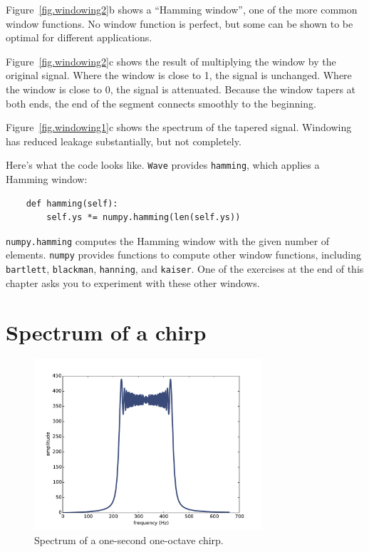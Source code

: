 \documentclass[12pt]{book}
\begin{document}
Figure~\ref{fig.windowing2}b shows a ``Hamming window'', one of the
more common window functions.  No window function is perfect, but some
can be shown to be optimal for different applications.

Figure~\ref{fig.windowing2}c shows the result of multiplying the
window by the original signal.  Where the window is close to 1, the
signal is unchanged.  Where the window is close to 0, the signal is
attenuated.  Because the window tapers at both ends, the end of the
segment connects smoothly to the beginning.

Figure~\ref{fig.windowing1}c shows the spectrum of the tapered signal.
Windowing has reduced leakage substantially, but not completely. 

Here's what the code looks like.  {\tt Wave} provides {\tt hamming},
which applies a Hamming window:

\begin{verbatim}
    def hamming(self):
        self.ys *= numpy.hamming(len(self.ys))
\end{verbatim}

{\tt numpy.hamming} computes the Hamming window with the given number
of elements.  {\tt numpy} provides functions to compute other window
functions, including {\tt bartlett}, {\tt blackman}, {\tt hanning},
and {\tt kaiser}.  One of the exercises at the end of this chapter
asks you to experiment with these other windows.


\section{Spectrum of a chirp}

\begin{figure}
\centerline{\includegraphics[height=2.5in]{figs/chirp1.pdf}}
\caption{Spectrum of a one-second one-octave chirp.}
\label{fig.chirp1}
\end{figure}
\end{document}
